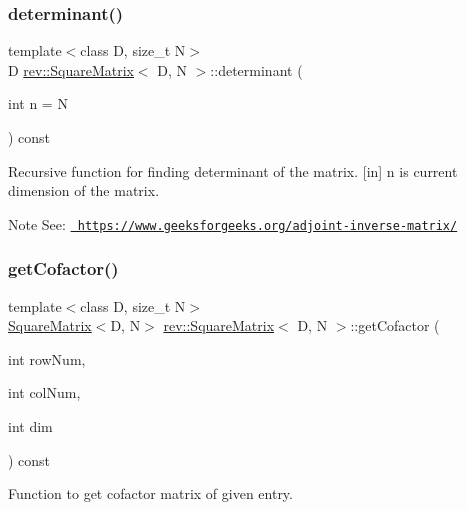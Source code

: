 \subsubsection{\texorpdfstring{determinant()}{determinant()}}
{\footnotesize\ttfamily template$<$class D, size\+\_\+t N$>$ \\
D \mbox{\hyperlink{classrev_1_1_square_matrix}{rev\+::\+Square\+Matrix}}$<$ D, N $>$\+::determinant (\begin{DoxyParamCaption}\item[{int}]{n = {\ttfamily N} }\end{DoxyParamCaption}) const\hspace{0.3cm}{\ttfamily [inline]}}



Recursive function for finding determinant of the matrix. \mbox{[}in\mbox{]} n is current dimension of the matrix. 

\begin{DoxyNote}{Note}
See\+: \href{https://www.geeksforgeeks.org/adjoint-inverse-matrix/}{\texttt{ https\+://www.\+geeksforgeeks.\+org/adjoint-\/inverse-\/matrix/}} 
\end{DoxyNote}
\mbox{\label{classrev_1_1_square_matrix_a204e6e236994f6fa470a8fac499071b6}} 
\subsubsection{\texorpdfstring{getCofactor()}{getCofactor()}}
{\footnotesize\ttfamily template$<$class D, size\+\_\+t N$>$ \\
\mbox{\hyperlink{classrev_1_1_square_matrix}{Square\+Matrix}}$<$D, N$>$ \mbox{\hyperlink{classrev_1_1_square_matrix}{rev\+::\+Square\+Matrix}}$<$ D, N $>$\+::get\+Cofactor (\begin{DoxyParamCaption}\item[{int}]{row\+Num,  }\item[{int}]{col\+Num,  }\item[{int}]{dim }\end{DoxyParamCaption}) const\hspace{0.3cm}{\ttfamily [inline]}}



Function to get cofactor matrix of given entry. 

